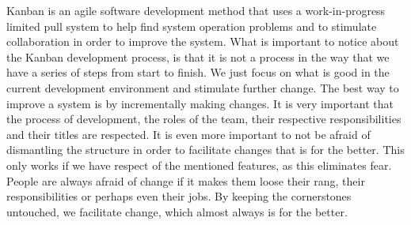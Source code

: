 Kanban is an agile software development method that uses a work-in-progress limited pull system to help find system operation problems and to stimulate collaboration in order to improve the system. What is important to notice about the Kanban development process, is that it is not a process in the way that we have a series of steps from start to finish. We just focus on what is good in the current development environment and stimulate further change. The best way to improve a system is by incrementally making changes.
\newline
\newline
It is very important that the process of development, the roles of the team, their respective responsibilities and their titles are respected. It is even more important to not be afraid of dismantling the structure in order to facilitate changes that is for the better. This only works if we have respect of the mentioned features, as this eliminates fear. People are always afraid of change if it makes them loose their rang, their responsibilities or perhaps even their jobs. By keeping the cornerstones untouched, we facilitate change, which almost always is for the better. 

